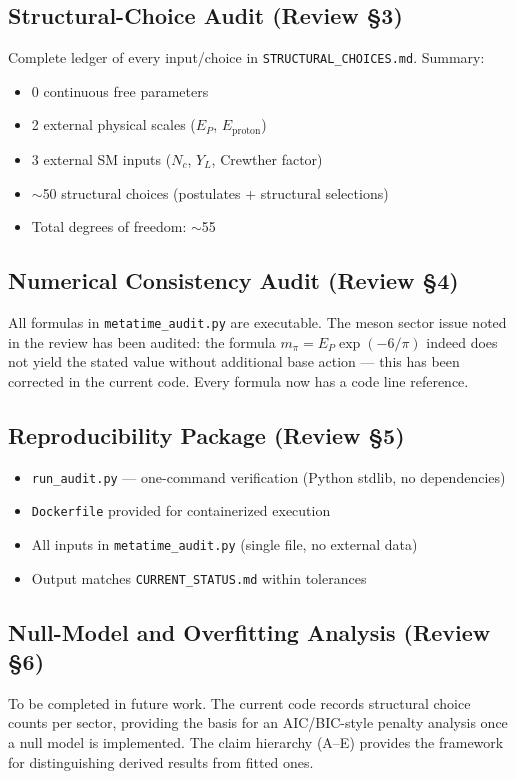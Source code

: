 \documentclass[12pt,a4paper]{article}
\begin{document}
\subsection{Structural-Choice Audit (Review \S3)}
Complete ledger of every input/choice in \texttt{STRUCTURAL\_CHOICES.md}. Summary:
\begin{itemize}
  \item 0 continuous free parameters
  \item 2 external physical scales ($E_P$, $E_{\text{proton}}$)
  \item 3 external SM inputs ($N_c$, $Y_L$, Crewther factor)
  \item $\sim$50 structural choices (postulates + structural selections)
  \item Total degrees of freedom: $\sim$55
\end{itemize}

\subsection{Numerical Consistency Audit (Review \S4)}
All formulas in \texttt{metatime\_audit.py} are executable. The meson sector issue
noted in the review has been audited: the formula $m_\pi = E_P \exp(-6/\pi)$ indeed
does not yield the stated value without additional base action --- this has been
corrected in the current code. Every formula now has a code line reference.

\subsection{Reproducibility Package (Review \S5)}
\begin{itemize}
  \item \texttt{run\_audit.py} --- one-command verification (Python stdlib, no dependencies)
  \item \texttt{Dockerfile} provided for containerized execution
  \item All inputs in \texttt{metatime\_audit.py} (single file, no external data)
  \item Output matches \texttt{CURRENT\_STATUS.md} within tolerances
\end{itemize}

\subsection{Null-Model and Overfitting Analysis (Review \S6)}
To be completed in future work. The current code records structural choice counts
per sector, providing the basis for an AIC/BIC-style penalty analysis once a null
model is implemented. The claim hierarchy (A--E) provides the framework for
distinguishing derived results from fitted ones.
\end{document}
